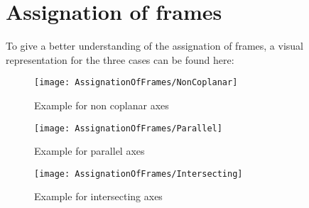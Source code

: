 \chapter{Assignation of frames}

To give a better understanding of the assignation of frames, a visual representation for the three cases can be found here:

\begin{figure}[H]
	
		\texttt{[image: AssignationOfFrames/NonCoplanar]}
		\caption{Example for non coplanar axes \cite{DenavitHartenbergKonventionen}}
		\label{fig:NonCoplanar}
	\end{figure}
	\begin{figure}[H]
		\texttt{[image: AssignationOfFrames/Parallel]}
		\caption{Example for parallel axes \cite{DenavitHartenbergKonventionen}}
		\label{fig:Parallel}
	\end{figure}
	\begin{figure}[H]
		\texttt{[image: AssignationOfFrames/Intersecting]}
		\caption{Example for intersecting axes \cite{DenavitHartenbergKonventionen}}
		\label{fig:Intersecting}
	
\end{figure}